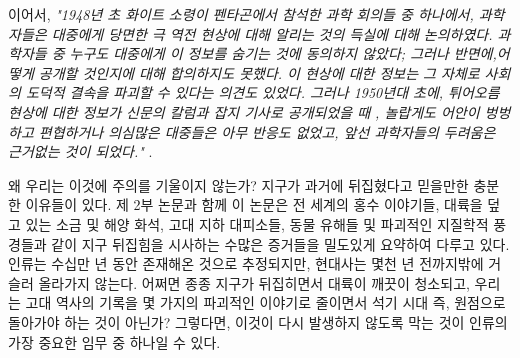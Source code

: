 \documentclass[10pt,twocolumn,letterpaper]{article}
\begin{document}
이어서, \textit{"1948년 초 화이트 소령이 펜타곤에서 참석한 과학 회의들 중 하나에서, 과학자들은 대중에게 당면한 극 역전  현상에 대해 알리는 것의 득실에 대해 논의하였다. 과학자들 중 누구도 대중에게 이 정보를 숨기는 것에 동의하지 않았다; 그러나 반면에,어떻게 공개할 것인지에 대해 합의하지도 못했다. 이 현상에 대한 정보는 그 자체로 사회의 도덕적 결속을 파괴할 수 있다는 의견도 있었다. 그러나 1950년대 초에, 튀어오름 현상에 대한 정보가 신문의 칼럼과 잡지 기사로 공개되었을 때 , 놀랍게도 어안이 벙벙하고 편협하거나 의심많은 대중들은 아무 반응도 없었고, 앞선 과학자들의 두려움은 근거없는 것이 되었다."} \cite{138,139}.

왜 우리는 이것에 주의를 기울이지 않는가? 지구가 과거에 뒤집혔다고 믿을만한  충분한 이유들이 있다. 제 2부 논문과 함께 이 논문은 전 세계의 홍수 이야기들, 대륙을 덮고 있는 소금 및 해양 화석, 고대 지하 대피소들, 동물 유해들 및 파괴적인 지질학적 풍경들과 같이 지구 뒤집힘을 시사하는 수많은 증거들을 밀도있게 요약하여 다루고 있다. 인류는 수십만 년 동안 존재해온 것으로 추정되지만, 현대사는 몇천 년 전까지밖에 거슬러 올라가지 않는다. 어쩌면 종종 지구가 뒤집히면서 대륙이 깨끗이 청소되고, 우리는 고대 역사의 기록을 몇 가지의 파괴적인 이야기로 줄이면서 석기 시대 즉, 원점으로 돌아가야 하는 것이 아닌가? 그렇다면, 이것이 다시 발생하지 않도록 막는 것이 인류의 가장 중요한 임무 중 하나일 수 있다.
\end{document}
